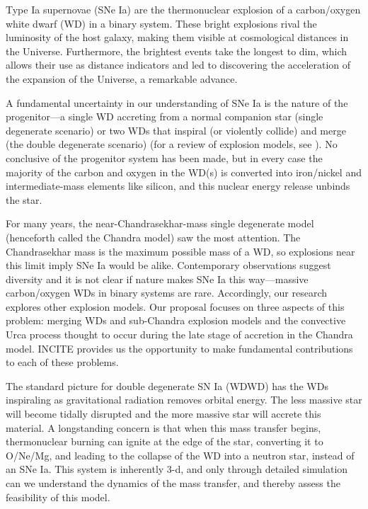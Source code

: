 Type Ia supernovae (SNe Ia) are the thermonuclear explosion of a
carbon/oxygen white dwarf (WD) in a binary system.  These bright
explosions rival the luminosity of the host galaxy, making them
visible at cosmological distances in the Universe. Furthermore, the
brightest events take the longest to dim, which allows their use as
distance indicators and led to discovering the acceleration of the
expansion of the Universe, a remarkable advance.

A fundamental uncertainty in our understanding of SNe Ia is the nature
of the progenitor---a single WD accreting from a normal companion star
(single degenerate scenario) or two WDs that inspiral (or
violently collide) and merge (the double degenerate scenario) (for a
review of explosion models, see \cite{calder:2013}).  No conclusive of
the progenitor system has been made, but in every case the majority of
the carbon and oxygen in the WD(s) is converted into
iron/nickel and intermediate-mass elements like silicon, and this
nuclear energy release unbinds the star.

For many years, the near-Chandrasekhar-mass single degenerate model
(henceforth called the Chandra model) saw the most attention.  The
Chandrasekhar mass is the maximum possible mass of a WD, so
explosions near this limit imply SNe Ia would be alike.  Contemporary
observations suggest diversity and it is not clear if nature makes SNe
Ia this way---massive carbon/oxygen WDs in binary systems are
rare.  Accordingly, our research explores other explosion models. Our
proposal focuses on three aspects of this problem: merging WDs
and sub-Chandra explosion models and the convective Urca
process thought to occur during the late stage of accretion in the
Chandra model.  INCITE provides us the opportunity to make fundamental
contributions to each of these problems.

The standard picture for double degenerate SN Ia (WDWD) has the WDs
inspiraling as gravitational radiation removes orbital energy.
The less massive star will become tidally disrupted and the more
massive star will accrete this material.  A longstanding concern is
that when this mass transfer begins, thermonuclear burning can ignite
at the edge of the star, converting it to O/Ne/Mg, and leading to the
collapse of the WD into a neutron star, instead of an SNe Ia.
This system is inherently 3-d, and only through detailed simulation
can we understand the dynamics of the mass transfer, and thereby
assess the feasibility of this model.

